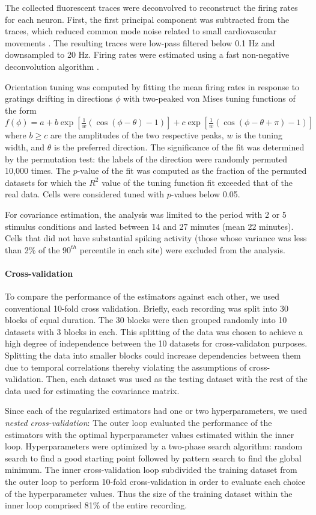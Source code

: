 \documentclass[10pt]{article}
\begin{document}
The collected fluorescent traces were deconvolved to reconstruct the firing rates for each neuron. First, the first principal component was subtracted from the traces, which reduced common mode noise related to small cardiovascular movements \cite{Cotton:2013}. The resulting traces were low-pass filtered below 0.1 Hz and downsampled to 20 Hz. Firing rates were estimated using a fast non-negative deconvolution algorithm \cite{Vogelstein:2010}.

Orientation tuning was computed by fitting the mean firing rates in response to gratings drifting in directions $\phi$ with two-peaked von Mises tuning functions of the form $f(\phi)=a + b\exp\left[\frac 1 w(\cos(\phi-\theta)-1) \right] + c\exp\left[\frac 1 w(\cos(\phi-\theta+\pi)-1) \right]$ where $b\ge c$ are the amplitudes of the two respective peaks, $w$ is the tuning width, and  $\theta$ is the preferred direction. The significance of the fit was determined by the permutation test: the labels of the direction were randomly permuted 10,000 times.  The $p$-value of the fit was computed as the fraction of the permuted datasets for which the $R^2$ value of the tuning function fit exceeded that of the real data.  Cells were considered tuned with $p$-values below 0.05.

For covariance estimation, the analysis was limited to the period with 2 or 5 stimulus conditions and lasted between 14 and 27 minutes (mean 22 minutes).  Cells that did not have substantial spiking activity (those whose variance was less than 2\% of the $90^{th}$ percentile in each site) were excluded from the analysis.

\paragraph{Cross-validation}
To compare the performance of the estimators against each other, we used conventional 10-fold cross validation. Briefly, each recording was split into 30 blocks of equal duration.  The 30 blocks were then grouped randomly into 10 datasets with 3 blocks in each.  This splitting of the data was chosen to achieve a high degree of independence between the 10 datasets for cross-validaton purposes. Splitting the data into smaller blocks could increase dependencies between them due to temporal correlations thereby violating the assumptions of cross-validation. Then, each dataset was used as the testing dataset with the rest of the data used for estimating the covariance matrix.  

Since each of the regularized estimators had one or two hyperparameters, we used \emph{nested cross-validation}:  The outer loop evaluated the performance of the estimators with the optimal hyperparameter values estimated within the inner loop.  Hyperparameters were optimized by a two-phase search algorithm: random search to find a good starting point followed by pattern search to find the global minimum.  The inner cross-validation loop subdivided the training dataset from the outer loop to perform 10-fold cross-validation in order to evaluate each choice of the hyperparameter values.  Thus the size of the training dataset within the inner loop comprised 81\% of the entire recording.
\end{document}
